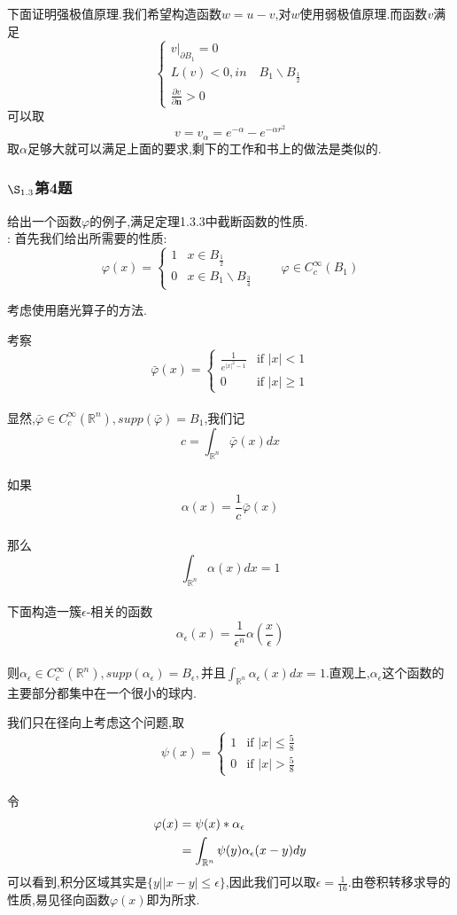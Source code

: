 \documentclass[12pt, a4paper]{article}
\begin{document}
	下面证明强极值原理.我们希望构造函数$w=u-v$,对$w$使用弱极值原理.而函数$v$满足
	$$\begin{cases}
	\left.v\right|_{\partial B_1} =0\\
	L(v)<0,in \quad B_1\backslash B_{\frac{1}{2}} \\ 
	\frac{\partial v}{\partial \bm{n}}>0
	\end{cases}$$
	可以取$$
	v=v_\alpha=e^{-\alpha}-e^{-\alpha r^2}$$
	取$\alpha$足够大就可以满足上面的要求,剩下的工作和书上的做法是类似的.\\
	
	
	\subsubsection{$\S_{1.3}$第4题}
	\kaishu{}给出一个函数$\varphi$的例子,满足定理1.3.3中截断函数的性质.\\
	
	\songti{}:
	首先我们给出所需要的性质:$$
	\varphi(x)=\begin{cases}
	1 &  x\in B_{\frac{1}{2}}\\
	0 &  x \in B_1 \backslash B_{\frac{3}{4}}
	\end{cases}	\qquad \varphi \in C_{c}^{\infty}(B_1)$$
	
	考虑使用磨光算子的方法.
	
	考察$$
	\bar{\varphi}(x)=	\begin{cases}
	\frac{1}{e^{|x|^2-1}} & \text{if } |x|<1\\
	0 & \text{if }  |x| \ge 1
	\end{cases}$$ \\
	显然,$\bar{\varphi} \in C_{c}^{\infty}(\mathbb{R}^n),supp(\bar{\varphi})=B_1$,我们记$$
	c=\int_{\mathbb{R}^n} \bar{\varphi}(x)dx	$$\\
	如果$$
	\alpha(x)=\frac{1}{c}\bar{\varphi}(x)	$$\\
	那么$$
	\int_{\mathbb{R}^n} \alpha(x)dx=1	$$\\
	下面构造一簇$\epsilon$-相关的函数$$
	\alpha_{\epsilon}(x)=\frac{1}{\epsilon^n}\alpha\left(\frac{x}{\epsilon}\right)	$$\\
	则$\alpha_{\epsilon} \in C_{c}^{\infty}(\mathbb{R}^n),supp(\alpha_{\epsilon})=B_{\epsilon},\text{并且}\int_{\mathbb{R}^n} \alpha_{\epsilon}(x)dx=1$.直观上,$\alpha_{\epsilon}$这个函数的主要部分都集中在一个很小的球内.
	
	我们只在径向上考虑这个问题,取$$
	\psi(x)=	\begin{cases}
	1 & \text{if } |x|\le \frac{5}{8}\\
	0 & \text{if }  |x| > \frac{5}{8}
	\end{cases}$$ \\
	令
	\begin{align}
		\varphi(x)&=\psi(x)\ast \alpha_{\epsilon} \notag \\
		&= \int_{\mathbb{R}^n} \psi(y) \alpha_{\epsilon}(x-y) dy  \notag
	\end{align}
	可以看到,积分区域其实是$\{ \left. y\right| |x-y| \le \epsilon \} $,因此我们可以取$\epsilon=\frac{1}{16}$.由卷积转移求导的性质,易见径向函数$\varphi(x)$即为所求.
	
\end{document}
